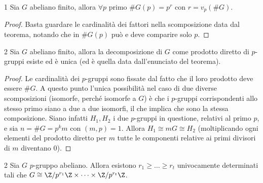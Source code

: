 \begin{corollary}{1}
    Sia $G$ abeliano finito, allora $\forall p$ primo $\#G(p) = p^r$ con $r = v_p(\#G)$.
\end{corollary}
\begin{proof}
    Basta guardare le cardinalità dei fattori nella scomposizione data dal teorema, notando che in $\#G(p)$ può e deve comparire solo $p$.
\end{proof}
\begin{corollary}{2}
    Sia $G$ abeliano finito, allora la decomposizione di $G$ come prodotto diretto di $p$-gruppi esiste ed è unica (ed è quella data dall'enunciato del teorema). 
\end{corollary}
\begin{proof}
    Le cardinalità dei $p$-gruppi sono fissate dal fatto che il loro prodotto deve essere $\#G$. A questo punto l'unica possibilità nel caso di due diverse scomposizioni (isomorfe, perché isomorfe a $G$) è che i $p$-gruppi corrispondenti allo stesso primo siano a due a due isomorfi, il che implica che sono la stessa composizione. Siano infatti $H_1, H_2$ i due $p$-gruppi in questione, relativi al primo $p$, e sia $n = \#G = p^km$ con $(m,p)=1$. Allora $H_1 \cong mG \cong H_2$ (moltiplicando ogni elementi del prodotto diretto per $m$ tutte le componenti relative ai primi divisori di $m$ diventano 0).
\end{proof}
\begin{theorem}{2}
    Sia $G$ $p$-gruppo abeliano. Allora esistono $r_1 \geq \dots \geq r_t$ univocamente determinati tali che $G \cong \Z/p^{r_1}\Z \times \dots \times \Z/p^{r_t}\Z$.
\end{theorem}
